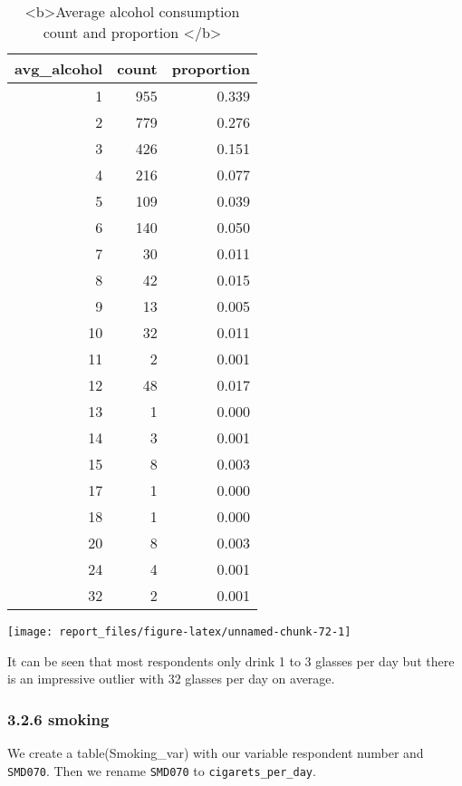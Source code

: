 \documentclass[
]{article}
\begin{document}
\begin{table}

\caption{\label{tab:unnamed-chunk-72}<b>Average alcohol consumption count and proportion </b>}
\centering
\begin{tabular}[t]{r|r|r}
\hline
avg\_alcohol & count & proportion\\
\hline
1 & 955 & 0.339\\
\hline
2 & 779 & 0.276\\
\hline
3 & 426 & 0.151\\
\hline
4 & 216 & 0.077\\
\hline
5 & 109 & 0.039\\
\hline
6 & 140 & 0.050\\
\hline
7 & 30 & 0.011\\
\hline
8 & 42 & 0.015\\
\hline
9 & 13 & 0.005\\
\hline
10 & 32 & 0.011\\
\hline
11 & 2 & 0.001\\
\hline
12 & 48 & 0.017\\
\hline
13 & 1 & 0.000\\
\hline
14 & 3 & 0.001\\
\hline
15 & 8 & 0.003\\
\hline
17 & 1 & 0.000\\
\hline
18 & 1 & 0.000\\
\hline
20 & 8 & 0.003\\
\hline
24 & 4 & 0.001\\
\hline
32 & 2 & 0.001\\
\hline
\end{tabular}
\end{table}

\begin{center}\texttt{[image: report\_files/figure-latex/unnamed-chunk-72-1]} \end{center}

It can be seen that most respondents only drink 1 to 3 glasses per day
but there is an impressive outlier with 32 glasses per day on average.

\hypertarget{smoking}{%
\subsubsection{3.2.6 smoking}\label{smoking}}

We create a table(Smoking\_var) with our variable respondent number and
\texttt{SMD070}. Then we rename \texttt{SMD070} to
\texttt{cigarets\_per\_day}.
\end{document}
